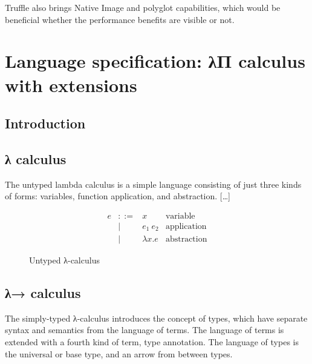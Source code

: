 \documentclass[english,zadani,odsaz]{fitthesis}
\begin{document}

Truffle also brings Native Image and polyglot capabilities, which would be
beneficial whether the performance benefits are visible or not.

\chapter{Language specification: λΠ calculus with extensions}
\label{sec:orgadcaaa0}
\section{Introduction}
\label{sec:orgc79c4c4}



\section{λ calculus}
\label{sec:org416888b}
The untyped lambda calculus is a simple language consisting of just three kinds
of forms: variables, function application, and abstraction. [\ldots{}]



\begin{figure}[!htpb]
\[\begin{array}{ccll}
e & ::= & x            & \text{variable} \\
  & |   & e_1~e_2      & \text{application} \\
  & |   & \lambda x. e & \text{abstraction}
\end{array}\]
\caption{Untyped λ-calculus}
\end{figure}

\section{λ→ calculus}
\label{sec:orgb259f14}

The simply-typed λ-calculus introduces the concept of types, which have separate
syntax and semantics from the language of terms. The language of terms is
extended with a fourth kind of term, type annotation. The language of types is
the universal or base type, and an arrow from between types.
\end{document}
